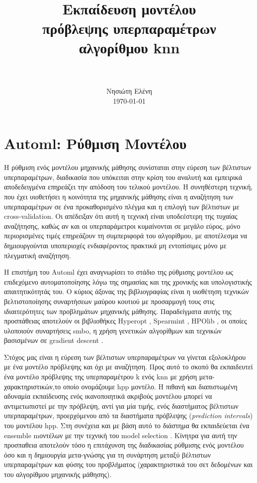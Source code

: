 \documentclass[]{article}
\title{
	\usefont{OT1}{bch}{b}{n}
	\normalfont \normalsize \textsc{} \\ 
	\horrule{0.5pt} \\[0.4cm]
	\huge  Εκπαίδευση μοντέλου \\πρόβλεψης υπερπαραμέτρων \\αλγορίθμου knn \\
	\horrule{2pt} \\[0.5cm]
}
\author{
	\normalfont 								\normalsize
	Νησιώτη Ελένη\\[-3pt]		\normalsize
	\today
}
\date{}
\numberwithin{equation}{section}		%
\numberwithin{figure}{section}			%
\numberwithin{table}{section}				%
\begin{document}
	\maketitle
    \section{Automl: Ρύθμιση Μοντέλου}
    H ρύθμιση ενός μοντέλου μηχανικής μάθησης συνίσταται στην εύρεση των βέλτιστων υπερπαραμέτρων, διαδικασία που υπόκειται στην κρίση του αναλυτή και εμπειρικά αποδεδειγμένα επηρεάζει την απόδοση του τελικού μοντέλου. Η συνηθέστερη τεχνική, που έχει υιοθετήσει η κοινότητα της μηχανικής μάθησης είναι η αναζήτηση των υπερπαραμέτρων σε ένα προκαθορισμένο πλέγμα και η επιλογή των βέλτιστων με cross-validation. Oι \citet{Bergstra:2011:AHO:2986459.2986743} απέδειξαν ότι αυτή η τεχνική είναι υποδεέστερη της τυχαίας αναζήτησης, καθώς αν και οι υπερπαράμετροι κυμαίνονται σε μεγάλο εύρος, μόνο περιορισμένες τιμές επηρεάζουν τη συμπεριφορά του αλγορίθμου, με αποτέλεσμα να δημιουργούνται υποπεριοχές ενδιαφέροντος πρακτικά μη εντοπίσιμες μόνο με πλεγματική αναζήτηση.

    Η επιστήμη του Automl έχει αναγνωρίσει το στάδιο της ρύθμισης μοντέλου ως επιδεχόμενο αυτοματοποίησης λόγω της σημασίας και της χρονικής και υπολογιστικής απαιτητικότητάς του. Ο κύριος άξονας της βιβλιογραφίας είναι η υιοθέτηση τεχνικών βελτιστοποίησης συναρτήσεων μαύρου κουτιού με προσαρμογή τους στις ιδιαιτερότητες των προβλημάτων μηχανικής μάθησης. Παραδείγματα αυτής της προσπάθειας αποτελούν οι βιβλιοθήκες Hyperopt \citep{hyperopt}, Spearmint \citep{spearmint}, HPOlib \citep{hpolib}, οι οποίες υλοποιούν συναρτήσεις \gls{smbo}, η χρήση γενετικών αλγορίθμων \citep{Hutter:2009:EIM:1569901.1569940} και τεχνικών βασισμένων σε gradient descent \citep{wassenberg}.
    
    Στόχος μας είναι η εύρεση των βέλτιστων υπερπαραμέτρων να γίνεται εξολοκλήρου με ένα μοντέλο πρόβλεψης και όχι με αναζήτηση. Προς αυτό το σκοπό θα εκπαιδευτεί ένα μοντέλο πρόβλεψης της υπερπαραμέτρου k ενός knn με χρήση μετα-χαρακτηριστικών,το οποίο ονομάζουμε \gls{hpp} μοντέλο. Η πιθανή και διαπιστωμένη \citep{Feurer:2014:UMI:3015544.3015549} αδυναμία εκπαίδευσης ενός ικανοποιητικά ακριβούς μοντέλου μπορεί να αντιμετωπιστεί με την πρόβλεψη, αντί για μία τιμής, ενός διαστήματος βέλτιστων υπερπαραμέτρων, προερχόμενου από τα διαστήματα πρόβλεψης (\textit{prediction intervals}) του μοντέλου \gls{hpp}. Στη συνέχεια και με βάση αυτό το διάστημα θα εκπαιδεύεται ένα ensemble mοντέλων με την τεχνική του model selection \citep{Caruana:2004:ESL:1015330.1015432}. Κίνητρα για αυτή την προσπαθεια αποτελούν τόσο η επιτάχυνση της διαδικασίας ρύθμισης ενός μοντέλου όσο και η δημιουργία μετα-γνώσης για τη συνάρτηση μεταξύ βέλτιστων υπερπαραμέτρων και φύσης του προβλήματος (χαρακτηριστικά του σετ δεδομένων και του αλγορίθμου μηχανικής μάθησης).
    
\end{document}
